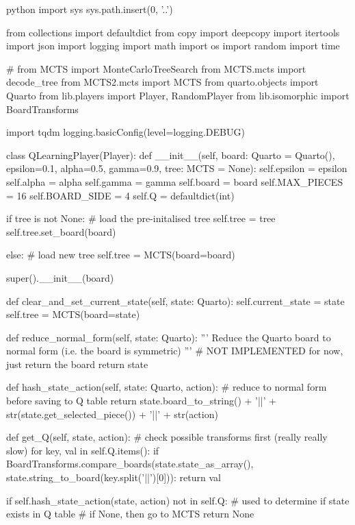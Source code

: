 \begin{mintedbox}{python}
import sys
sys.path.insert(0, '..')

from collections import defaultdict
from copy import deepcopy
import itertools
import json
import logging
import math
import os
import random
import time

# from MCTS import MonteCarloTreeSearch
from MCTS.mcts import decode_tree
from MCTS2.mcts import MCTS
from quarto.objects import Quarto
from lib.players import Player, RandomPlayer
from lib.isomorphic import BoardTransforms

import tqdm
logging.basicConfig(level=logging.DEBUG)


class QLearningPlayer(Player):
    def __init__(self, board: Quarto = Quarto(), epsilon=0.1, alpha=0.5, gamma=0.9, tree: MCTS = None):
        self.epsilon = epsilon
        self.alpha = alpha
        self.gamma = gamma
        self.board = board
        self.MAX_PIECES = 16
        self.BOARD_SIDE = 4
        self.Q = defaultdict(int)

        if tree is not None:
            # load the pre-initalised tree
            self.tree = tree
            self.tree.set_board(board)

        else:
            # load new tree
            self.tree = MCTS(board=board)

        super().__init__(board)

    def clear_and_set_current_state(self, state: Quarto):
        self.current_state = state
        self.tree = MCTS(board=state)

    def reduce_normal_form(self, state: Quarto):
        '''
        Reduce the Quarto board to normal form (i.e. the board is symmetric)
        '''
        # NOT IMPLEMENTED for now, just return the board
        return state

    def hash_state_action(self, state: Quarto, action):
        # reduce to normal form before saving to Q table
        return state.board_to_string() + '||' + str(state.get_selected_piece()) + '||' + str(action)

    def get_Q(self, state, action):
        # check possible transforms first (really really slow)
        for key, val in self.Q.items():
            if BoardTransforms.compare_boards(state.state_as_array(), state.string_to_board(key.split('||')[0])):
                return val

        if self.hash_state_action(state, action) not in self.Q:
            # used to determine if state exists in Q table
            # if None, then go to MCTS
            return None


\end{mintedbox}
